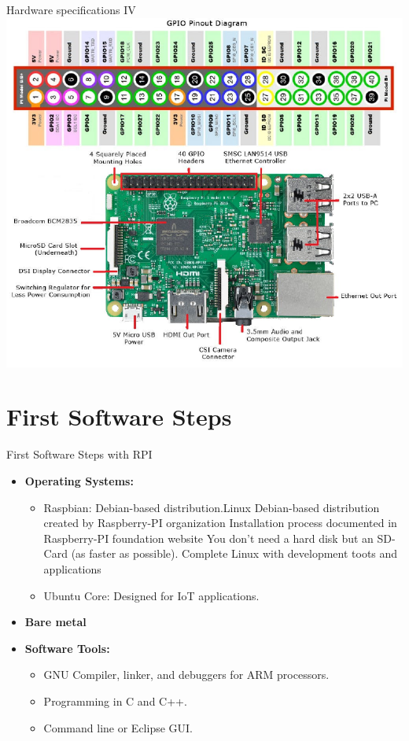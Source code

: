 \begin{frame}{Hardware specifications IV}
    \includegraphics[scale=0.8]{trainingmaterials/rpibasics/RPIand40pin.pdf}
\end{frame}
\section{First Software Steps}
\begin{frame}{First Software Steps with RPI}
  \begin{itemize}
    \item \textbf{Operating Systems:}
    \begin{itemize}
      \item Raspbian: Debian-based distribution.Linux Debian-based distribution created by Raspberry-PI organization Installation process documented in Raspberry-PI foundation website You don’t need a hard disk but an SD-Card (as faster as possible). Complete Linux with development toots and applications
      \item Ubuntu Core: Designed for IoT applications.
    \end{itemize}
    \item \textbf{Bare metal}
    \item \textbf{Software Tools:}
    \begin{itemize}
      \item GNU Compiler, linker, and debuggers for ARM processors.
      \item Programming in C and C++.
      \item Command line or Eclipse GUI.
    \end{itemize}
  \end{itemize}
\end{frame}



